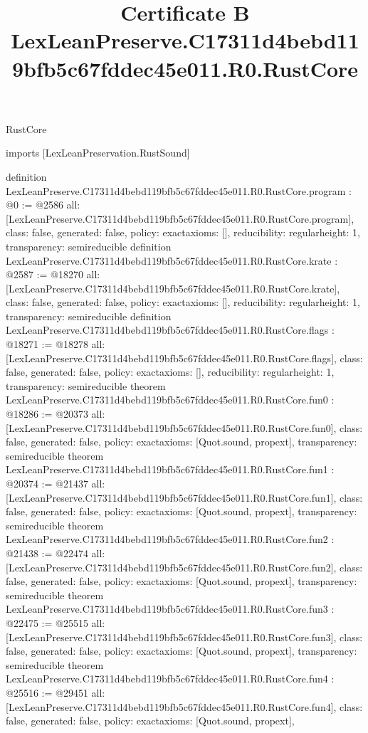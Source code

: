 \begin{lexlean}{RustCore}
\title{Certificate B LexLeanPreserve.C17311d4bebd119bfb5c67fddec45e011.R0.RustCore}
\begin{coremodule}
imports [LexLeanPreservation.RustSound]

definition LexLeanPreserve.C17311d4bebd119bfb5c67fddec45e011.R0.RustCore.program : @0 := @2586 {
  all: [LexLeanPreserve.C17311d4bebd119bfb5c67fddec45e011.R0.RustCore.program],
  class: false,
  generated: false,
  policy: exact{axioms: []},
  reducibility: regular{height: 1},
  transparency: semireducible
}
definition LexLeanPreserve.C17311d4bebd119bfb5c67fddec45e011.R0.RustCore.krate : @2587 := @18270 {
  all: [LexLeanPreserve.C17311d4bebd119bfb5c67fddec45e011.R0.RustCore.krate],
  class: false,
  generated: false,
  policy: exact{axioms: []},
  reducibility: regular{height: 1},
  transparency: semireducible
}
definition LexLeanPreserve.C17311d4bebd119bfb5c67fddec45e011.R0.RustCore.flags : @18271 := @18278 {
  all: [LexLeanPreserve.C17311d4bebd119bfb5c67fddec45e011.R0.RustCore.flags],
  class: false,
  generated: false,
  policy: exact{axioms: []},
  reducibility: regular{height: 1},
  transparency: semireducible
}
theorem LexLeanPreserve.C17311d4bebd119bfb5c67fddec45e011.R0.RustCore.fun0 : @18286 := @20373 {
  all: [LexLeanPreserve.C17311d4bebd119bfb5c67fddec45e011.R0.RustCore.fun0],
  class: false,
  generated: false,
  policy: exact{axioms: [Quot.sound, propext]},
  transparency: semireducible
}
theorem LexLeanPreserve.C17311d4bebd119bfb5c67fddec45e011.R0.RustCore.fun1 : @20374 := @21437 {
  all: [LexLeanPreserve.C17311d4bebd119bfb5c67fddec45e011.R0.RustCore.fun1],
  class: false,
  generated: false,
  policy: exact{axioms: [Quot.sound, propext]},
  transparency: semireducible
}
theorem LexLeanPreserve.C17311d4bebd119bfb5c67fddec45e011.R0.RustCore.fun2 : @21438 := @22474 {
  all: [LexLeanPreserve.C17311d4bebd119bfb5c67fddec45e011.R0.RustCore.fun2],
  class: false,
  generated: false,
  policy: exact{axioms: [Quot.sound, propext]},
  transparency: semireducible
}
theorem LexLeanPreserve.C17311d4bebd119bfb5c67fddec45e011.R0.RustCore.fun3 : @22475 := @25515 {
  all: [LexLeanPreserve.C17311d4bebd119bfb5c67fddec45e011.R0.RustCore.fun3],
  class: false,
  generated: false,
  policy: exact{axioms: [Quot.sound, propext]},
  transparency: semireducible
}
theorem LexLeanPreserve.C17311d4bebd119bfb5c67fddec45e011.R0.RustCore.fun4 : @25516 := @29451 {
  all: [LexLeanPreserve.C17311d4bebd119bfb5c67fddec45e011.R0.RustCore.fun4],
  class: false,
  generated: false,
  policy: exact{axioms: [Quot.sound, propext]},
}
\end{coremodule}
\end{lexlean}
